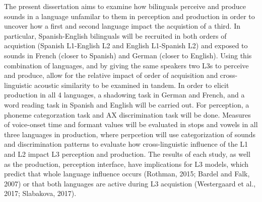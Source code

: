 The present dissertation aims to examine how bilinguals perceive and produce sounds in a language unfamilar to them in perception and production in order to uncover how a first and second language impact the acquistion of a third.
In particular, Spanish-English bilinguals will be recruited in both orders of acquistion (Spanish L1-English L2 and English L1-Spanish L2) and exposed to sounds in French (closer to Spanish) and German (closer to English).
Using this combination of languages, and by giving the same speakers two L3s to perceive and produce, allow for the relative impact of order of acquisition and cross-linguistic acoustic similarity to be examined in tandem. 
In order to elicit production in all 4 languages, a shadowing task in German and French, and a word reading task in Spanish and English will be carried out. 
For perception, a phoneme categorzation task and AX discrimination task will be done. 
Measures of voice-onset time and formant values will be evaluated in stops and vowels in all three languages in production, where perpcetion will use categorization of sounds and discrimination patterns to evaluate how cross-linguistic influence of the L1 and L2 impact L3 perception and production. 
The results of each study, as well as the production, perception interface, have implications for L3 models, which predict that whole language influence occurs (Rothman, 2015; Bardel and Falk, 2007) or that both languages are active during L3 acquistion (Westergaard et al., 2017; Slabakova, 2017).